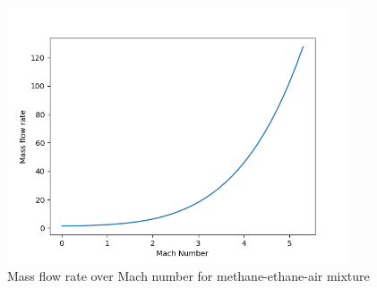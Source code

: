 \documentclass[a4paper,11pt]{article}
\begin{document}
	\begin{figure}[H]
		\centering
		\includegraphics[width=0.9\textwidth]{metan(1mol)_etan(0.4mol)_pow/Mass_flow_rate_over_Mach.png}
       		\caption{Mass flow rate over Mach number for methane-ethane-air mixture}
	\end{figure}
\end{document}
